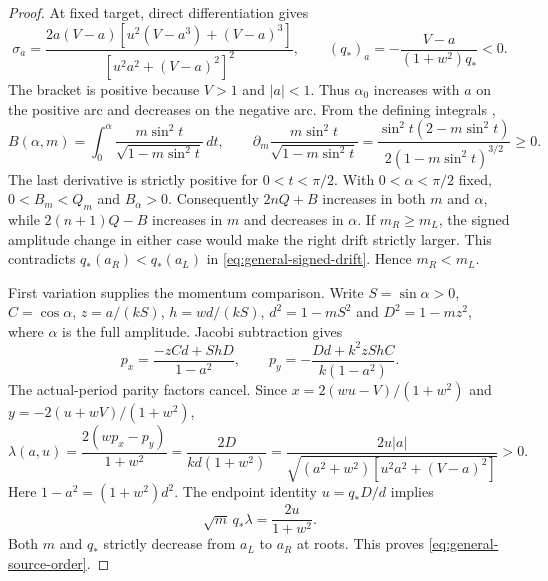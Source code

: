 \documentclass[11pt,a4paper]{article}
\theoremstyle{remark}\newtheorem{remark}[theorem]{Remark}
\begin{document}
\begin{proof}
At fixed target, direct differentiation gives
\begin{equation}\label{eq:general-amplitude-monotonicity}
 \sigma_a=\frac{2a(V-a)[u^2(V-a^3)+(V-a)^3]}
 {[u^2a^2+(V-a)^2]^2},\qquad
 (q_*)_a=-\frac{V-a}{(1+w^2)q_*}<0.
\end{equation}
The bracket is positive because $V>1$ and $|a|<1$. Thus $\alpha_0$
increases with $a$ on the positive arc and decreases on the negative arc.
From the defining integrals \cite[Equations 19.2.4--19.2.8]{DLMF},
\[
 B(\alpha,m)=\int_0^\alpha
 \frac{m\sin^2t}{\sqrt{1-m\sin^2t}}\,dt,\qquad
 \partial_m\frac{m\sin^2t}{\sqrt{1-m\sin^2t}}
 =\frac{\sin^2t(2-m\sin^2t)}{2(1-m\sin^2t)^{3/2}}\ge0.
\]
The last derivative is strictly positive for $0<t<\pi/2$. With
$0<\alpha<\pi/2$ fixed, $0<B_m<Q_m$ and $B_\alpha>0$.
Consequently $2nQ+B$ increases in both $m$ and $\alpha$, while
$2(n+1)Q-B$ increases in $m$ and decreases in $\alpha$.
If $m_R\ge m_L$, the signed amplitude change in either case would
make the right drift strictly larger. This contradicts
$q_*(a_R)<q_*(a_L)$ in \eqref{eq:general-signed-drift}.
Hence $m_R<m_L$.

First variation supplies the momentum comparison. Write
$S=\sin\alpha>0$, $C=\cos\alpha$, $z=a/(kS)$, $h=wd/(kS)$,
$d^2=1-mS^2$ and $D^2=1-mz^2$, where $\alpha$ is the full amplitude.
Jacobi subtraction \cite[Equations 22.8.1 and 22.8.3]{DLMF} gives
\[
 p_x=\frac{-zCd+ShD}{1-a^2},\qquad
 p_y=-\frac{Dd+k^2zShC}{k(1-a^2)}.
\]
The actual-period parity factors cancel. Since
$x=2(wu-V)/(1+w^2)$ and $y=-2(u+wV)/(1+w^2)$,
\begin{equation}\label{eq:line-clock-derivative}
 \lambda(a,u)=\frac{2(wp_x-p_y)}{1+w^2}
 =\frac{2D}{kd(1+w^2)}
 =\frac{2u|a|}{\sqrt{(a^2+w^2)[u^2a^2+(V-a)^2]}}>0.
\end{equation}
Here $1-a^2=(1+w^2)d^2$. The endpoint identity $u=q_*D/d$ implies
\begin{equation}\label{eq:general-momentum-product}
 \sqrt m\,q_*\lambda=\frac{2u}{1+w^2}.
\end{equation}
Both $m$ and $q_*$ strictly decrease from $a_L$ to $a_R$ at roots.
This proves \eqref{eq:general-source-order}.


\end{proof}
\end{document}
